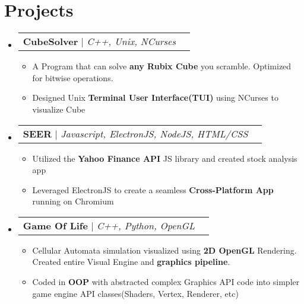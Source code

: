 \documentclass[letterpaper,11pt]{article}
\makeatletter
\newcommand{\resumeItem}[1]{
  \item\small{
    {#1 \vspace{-2pt}}
  }
}
\newcommand{\resumeProjectHeading}[2]{
    \item
    \begin{tabular*}{0.97\textwidth}{l@{\extracolsep{\fill}}r}
      \small#1 & #2 \\
    \end{tabular*}\vspace{-7pt}
}
\newcommand{\resumeSubHeadingListStart}{\begin{itemize}[leftmargin=0.15in, label={}]}
\newcommand{\resumeSubHeadingListEnd}{\end{itemize}}
\newcommand{\resumeItemListStart}{\begin{itemize}}
\newcommand{\resumeItemListEnd}{\end{itemize}\vspace{-5pt}}
\makeatother
\begin{document}
\section{Projects}
    \resumeSubHeadingListStart
      \resumeProjectHeading
      {\textbf{CubeSolver} $|$ \emph{C++, Unix, NCurses}}{}
        \resumeItemListStart
        \resumeItem{A Program that can solve \textbf{any Rubix Cube} you scramble. Optimized for bitwise operations.}
        \resumeItem{Designed Unix \textbf{Terminal User Interface(TUI)} using NCurses to visualize Cube}
      \resumeItemListEnd
      \resumeProjectHeading
        {\textbf{SEER} $|$ \emph{Javascript, ElectronJS, NodeJS, HTML/CSS}}{}
          \resumeItemListStart
          \resumeItem {Utilized the \textbf{Yahoo Finance API} JS library and created stock analysis app}
          \resumeItem{Leveraged ElectronJS to create a seamless \textbf{Cross-Platform App} running on Chromium}
          \resumeItemListEnd
         
      \resumeProjectHeading
         {\textbf{Game Of Life} $|$ \emph{C++, Python, OpenGL}}{}
          \resumeItemListStart
            \resumeItem{ Cellular Automata simulation visualized using \textbf{2D OpenGL} Rendering. Created entire Visual Engine and \textbf{graphics pipeline}.}
            \resumeItem {Coded in \textbf{OOP} with abstracted complex Graphics API code into simpler {game engine API} classes(Shaders, Vertex, Renderer, etc)}
          \resumeItemListEnd
    \resumeSubHeadingListEnd
%
\end{document}
